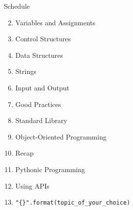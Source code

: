 \begin{frame}[fragile]{Schedule}

    \begin{enumerate}

        \setcounter{enumi}{1}
        \item Variables and Assignments
        \item Control Structures
        \item Data Structures
        \item Strings
        \item Input and Output
        \item Good Practices
        \item Standard Library
        \item Object-Oriented Programming
        \item Recap
        \item Pythonic Programming
        \item Using APIs
        \item \texttt{"\{\}".format(topic\_of\_your\_choice)}

    \end{enumerate}


\end{frame}


